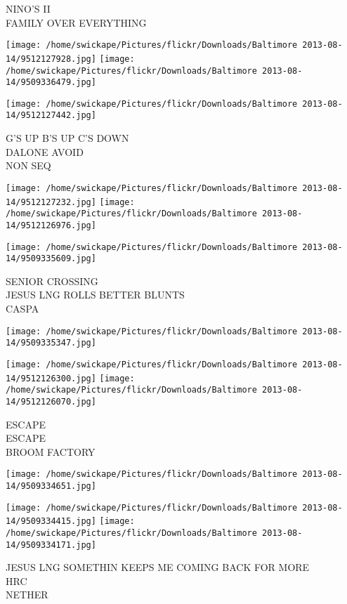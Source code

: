 \documentclass[10pt,letterpaper]{article}
\begin{document}
NINO'S II\\
FAMILY OVER EVERYTHING
\pagebreak

\texttt{[image: /home/swickape/Pictures/flickr/Downloads/Baltimore 2013-08-14/9512127928.jpg]}
\texttt{[image: /home/swickape/Pictures/flickr/Downloads/Baltimore 2013-08-14/9509336479.jpg]}

\vspace{0.25in}
\texttt{[image: /home/swickape/Pictures/flickr/Downloads/Baltimore 2013-08-14/9512127442.jpg]}

G'S UP B'S UP C'S DOWN\\
DALONE AVOID\\
NON SEQ
\pagebreak

\texttt{[image: /home/swickape/Pictures/flickr/Downloads/Baltimore 2013-08-14/9512127232.jpg]}
\texttt{[image: /home/swickape/Pictures/flickr/Downloads/Baltimore 2013-08-14/9512126976.jpg]}

\texttt{[image: /home/swickape/Pictures/flickr/Downloads/Baltimore 2013-08-14/9509335609.jpg]}

SENIOR CROSSING\\
JESUS LNG ROLLS BETTER BLUNTS\\
CASPA
\pagebreak

\texttt{[image: /home/swickape/Pictures/flickr/Downloads/Baltimore 2013-08-14/9509335347.jpg]}

\vspace{0.25in}
\texttt{[image: /home/swickape/Pictures/flickr/Downloads/Baltimore 2013-08-14/9512126300.jpg]}
\texttt{[image: /home/swickape/Pictures/flickr/Downloads/Baltimore 2013-08-14/9512126070.jpg]}

ESCAPE\\
ESCAPE\\
BROOM FACTORY
\pagebreak

\texttt{[image: /home/swickape/Pictures/flickr/Downloads/Baltimore 2013-08-14/9509334651.jpg]}

\vspace{0.25in}
\texttt{[image: /home/swickape/Pictures/flickr/Downloads/Baltimore 2013-08-14/9509334415.jpg]}
\texttt{[image: /home/swickape/Pictures/flickr/Downloads/Baltimore 2013-08-14/9509334171.jpg]}

JESUS LNG SOMETHIN KEEPS ME COMING BACK FOR MORE\\
HRC\\
NETHER
\pagebreak
\end{document}
